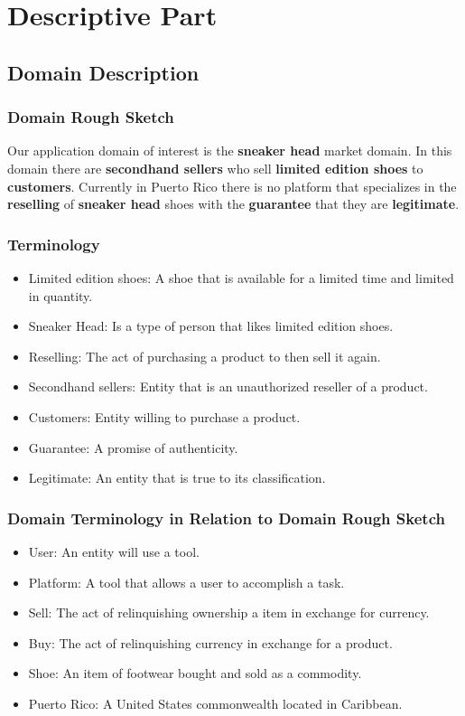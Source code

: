 \chapter{Descriptive Part}
\newpage
\section{Domain Description}
\subsection{Domain Rough Sketch}
Our application domain of interest is the \textbf{sneaker head} market domain. In this domain there are \textbf{secondhand sellers} who sell \textbf{limited edition shoes} to \textbf{customers}. Currently in Puerto Rico there is no platform that specializes in the \textbf{reselling} of \textbf{sneaker head} shoes with the \textbf{guarantee} that they are \textbf{legitimate}.
\subsection{Terminology}
\begin{itemize}
  \item Limited edition shoes: A shoe that is available for a limited time and limited in quantity.
  \item Sneaker Head: Is a type of person that likes limited edition shoes.
  \item Reselling: The act of purchasing a product to then sell it again.
  \item Secondhand sellers: Entity that is an unauthorized reseller of a product.
  \item Customers: Entity willing to purchase a product.
  \item Guarantee: A promise of authenticity.
  \item Legitimate: An entity that is true to its classification.
\end{itemize}
\subsection{Domain Terminology in Relation to Domain Rough Sketch}
\begin{itemize}
  \item User: An entity will use a tool.
  \item Platform: A tool that allows a user to accomplish a task.
  \item Sell: The act of relinquishing ownership a item in exchange for currency.
  \item Buy: The act of relinquishing currency in exchange for a product.
  \item Shoe: An item of footwear bought and sold as a commodity.
  \item Puerto Rico: A United States commonwealth located in Caribbean.
\end{itemize}

